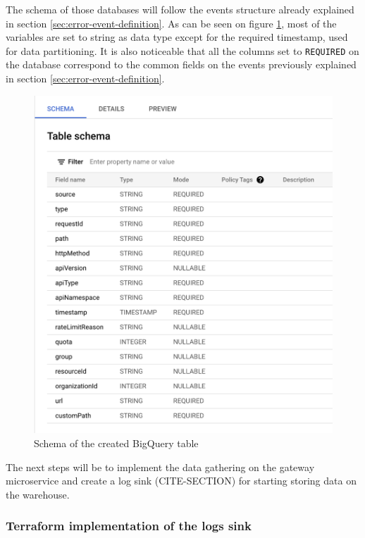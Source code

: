 \documentclass[english, 12pt, a4paper, sci, utf8, a-1b, online]{aaltothesis}
\begin{document}
The schema of those databases will follow the events structure already explained in section \ref{sec:error-event-definition}. As can be seen on figure \ref{fig:bigquery-schema}, most of the variables are set to string as data type except for the required timestamp, used for data partitioning. It is also noticeable that all the columns set to \texttt{REQUIRED} on the database correspond to the common fields on the events previously explained in section \ref{sec:error-event-definition}. \\

\begin{figure}[h!]
    \centering
    \includegraphics[scale=0.3]{src/thesis/img/technical-solution/bigquery-schema.png}
    \caption{Schema of the created BigQuery table}
    \label{fig:bigquery-schema}
\end{figure}

The next steps will be to implement the data gathering on the gateway microservice and create a log sink (CITE-SECTION) for starting storing data on the warehouse.

\subsubsection{Terraform implementation of the logs sink}
\end{document}
